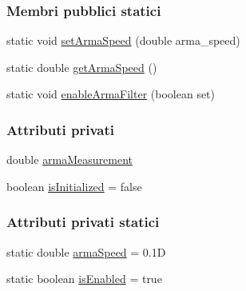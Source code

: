 \subsubsection*{Membri pubblici statici}
\begin{DoxyCompactItemize}
\item 
static void \hyperlink{classit_1_1unibo_1_1torsello_1_1bluetoothpositioning_1_1configuration_1_1MyArmaRssiFilter_a87e5ed9b294bed2cedcbda1ee06bc8ee_a87e5ed9b294bed2cedcbda1ee06bc8ee}{set\+Arma\+Speed} (double arma\+\_\+speed)
\item 
static double \hyperlink{classit_1_1unibo_1_1torsello_1_1bluetoothpositioning_1_1configuration_1_1MyArmaRssiFilter_a91c321ccd7297b3973712cc175f92fa1_a91c321ccd7297b3973712cc175f92fa1}{get\+Arma\+Speed} ()
\item 
static void \hyperlink{classit_1_1unibo_1_1torsello_1_1bluetoothpositioning_1_1configuration_1_1MyArmaRssiFilter_a0ce35b24ad6c6d9abe69e038b3e8da7d_a0ce35b24ad6c6d9abe69e038b3e8da7d}{enable\+Arma\+Filter} (boolean set)
\end{DoxyCompactItemize}
\subsubsection*{Attributi privati}
\begin{DoxyCompactItemize}
\item 
double \hyperlink{classit_1_1unibo_1_1torsello_1_1bluetoothpositioning_1_1configuration_1_1MyArmaRssiFilter_a2be11d7395143321b8f2063afe14a8d0_a2be11d7395143321b8f2063afe14a8d0}{arma\+Measurement}
\item 
boolean \hyperlink{classit_1_1unibo_1_1torsello_1_1bluetoothpositioning_1_1configuration_1_1MyArmaRssiFilter_a01cc7f81fd8e0ca8ed3c197d9fc1fd11_a01cc7f81fd8e0ca8ed3c197d9fc1fd11}{is\+Initialized} = false
\end{DoxyCompactItemize}
\subsubsection*{Attributi privati statici}
\begin{DoxyCompactItemize}
\item 
static double \hyperlink{classit_1_1unibo_1_1torsello_1_1bluetoothpositioning_1_1configuration_1_1MyArmaRssiFilter_a5332b55e26b28536d1f8c7cae5e684b4_a5332b55e26b28536d1f8c7cae5e684b4}{arma\+Speed} = 0.\+1D
\item 
static boolean \hyperlink{classit_1_1unibo_1_1torsello_1_1bluetoothpositioning_1_1configuration_1_1MyArmaRssiFilter_a7a046687ef0d8dd63307cabfbb33fcf8_a7a046687ef0d8dd63307cabfbb33fcf8}{is\+Enabled} = true
\end{DoxyCompactItemize}


